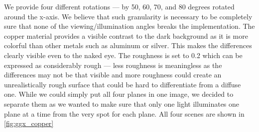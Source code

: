 We provide four different rotations --- by 50, 60, 70, and 80 degrees rotated around the x-axis. We believe that such granularity is necessary to be completely sure that none of the viewing/illumination angles breaks the implementation. The copper material provides a visible contrast to the dark background as it is more colorful than other metals such as aluminum or silver. This makes the differences clearly visible even to the naked eye. The roughness is set to 0.2 which can be expressed as considerably rough --- less roughness is meaningless as the differences may not be that visible and more roughness could create an unrealistically rough surface that could be hard to differentiate from a diffuse one. While we could simply put all four planes in one image, we decided to separate them as we wanted to make sure that only one light illuminates one plane at a time from the very spot for each plane. All four scenes are shown in \autoref{fig:ggx_copper}

